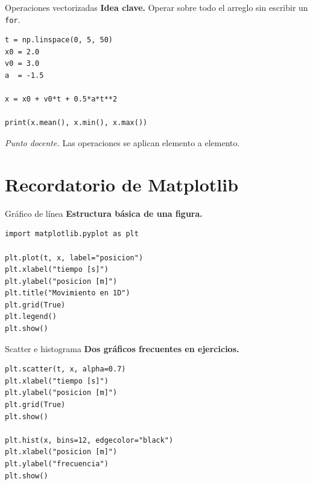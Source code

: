 \documentclass[10pt]{beamer}
\begin{document}
\begin{frame}[fragile]{Operaciones vectorizadas}
\textbf{Idea clave.} Operar sobre todo el arreglo sin escribir un \texttt{for}.
\begin{verbatim}
t = np.linspace(0, 5, 50)
x0 = 2.0
v0 = 3.0
a  = -1.5

x = x0 + v0*t + 0.5*a*t**2

print(x.mean(), x.min(), x.max())
\end{verbatim}
\textit{Punto docente.} Las operaciones se aplican elemento a elemento.
\end{frame}

\section{Recordatorio de Matplotlib}
\begin{frame}[fragile]{Gráfico de línea}
\textbf{Estructura básica de una figura.}
\begin{verbatim}
import matplotlib.pyplot as plt

plt.plot(t, x, label="posicion")
plt.xlabel("tiempo [s]")
plt.ylabel("posicion [m]")
plt.title("Movimiento en 1D")
plt.grid(True)
plt.legend()
plt.show()
\end{verbatim}
\end{frame}

\begin{frame}[fragile]{Scatter e histograma}
\textbf{Dos gráficos frecuentes en ejercicios.}
\begin{verbatim}
plt.scatter(t, x, alpha=0.7)
plt.xlabel("tiempo [s]")
plt.ylabel("posicion [m]")
plt.grid(True)
plt.show()

plt.hist(x, bins=12, edgecolor="black")
plt.xlabel("posicion [m]")
plt.ylabel("frecuencia")
plt.show()
\end{verbatim}
\end{frame}

\end{document}
